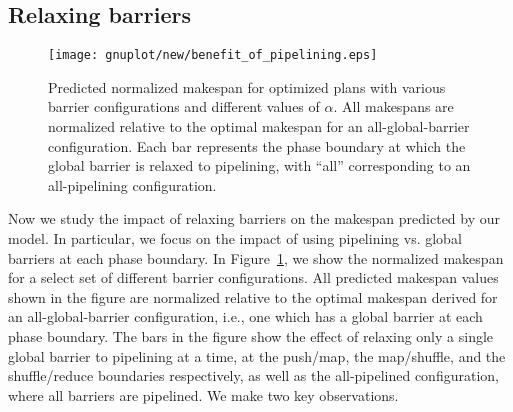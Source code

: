\subsection{Relaxing barriers}
\label{subsec:barriers}

\begin{figure}[htbp]
  \centering
  \texttt{[image: gnuplot/new/benefit\_of\_pipelining.eps]}
  \caption{Predicted normalized makespan for optimized plans with various
  barrier configurations and different values of $\alpha$.
  All makespans are normalized relative to the optimal makespan for an
  all-global-barrier configuration.  Each bar represents the phase boundary at
  which the global barrier is relaxed to pipelining, with ``all'' corresponding
  to an all-pipelining configuration.
  \label{fig:benefit_of_pipelining}}
\end{figure}

Now we study the impact of relaxing barriers on the makespan predicted by our
model.
In particular, we focus on the impact of using pipelining vs. global barriers
at each phase boundary.
In Figure~\ref{fig:benefit_of_pipelining}, we show the normalized makespan for
a select set of different barrier configurations.
All predicted makespan values shown in the figure are normalized relative to
the optimal makespan derived for an all-global-barrier configuration, i.e., one
which has a global barrier at each phase boundary.
The bars in the figure show the effect of relaxing only a single global barrier
to pipelining at a time, at the push/map, the map/shuffle, and the
shuffle/reduce boundaries respectively, as well as  the all-pipelined
configuration, where all barriers are pipelined. We make two key observations.

